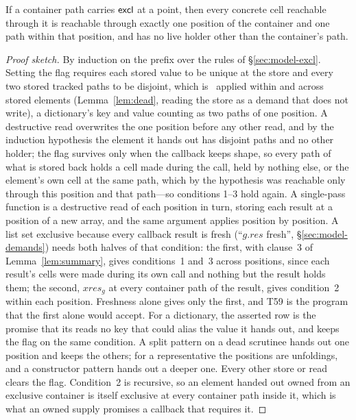 \begin{lemma}
\label{lem:excl}
If a container path carries $\mathsf{excl}$ at a point, then every concrete cell reachable through it is
reachable through exactly one position of the container and one path within that position, and has no
live holder other than the container's path.
\end{lemma}
\begin{proof}[Proof sketch]
By induction on the prefix over the rules of \S\ref{sec:model-excl}. Setting the flag requires each
stored value to be unique at the store and every two stored tracked paths to be disjoint, which is
\Disjoint\ applied within and across stored elements (Lemma~\ref{lem:dead}, reading the store as a
demand that does not write), a dictionary's key and value counting as two paths of one position. A
destructive read overwrites the one position before any other read, and by the induction hypothesis the
element it hands out has disjoint paths and no other holder; the flag survives only when the callback
keeps shape, so every path of what is stored back holds a cell made during the call, held by nothing
else, or the element's own cell at the same path, which by the hypothesis was reachable only through this
position and that path---so conditions 1--3 hold again. A single-pass function is a destructive read of
each position in turn, storing each result at a position of a new array, and the same argument applies
position by position. A list set exclusive because every callback result is fresh (``$g.\mathit{res}$
fresh'', \S\ref{sec:model-demands}) needs both halves of that condition: the first, with clause~3 of
Lemma~\ref{lem:summary}, gives conditions~1 and~3 across positions, since each result's cells were made
during its own call and nothing but the result holds them; the second, $\mathit{xres}_g$ at every container
path of the result, gives condition~2 within each position. Freshness alone gives only the first, and T59
is the program that the first alone would accept. For a dictionary, the asserted row is the promise that its  reads no
key that could alias the value it hands out, and keeps the flag on the same condition. A split pattern on
a dead scrutinee hands out one position and keeps the others; for a representative the positions are
unfoldings, and a constructor pattern hands out a deeper one. Every other store or read clears the flag.
Condition~2 is recursive, so an element handed out owned from an exclusive container is itself exclusive
at every container path inside it, which is what an owned supply promises a callback that requires it.
\end{proof}

